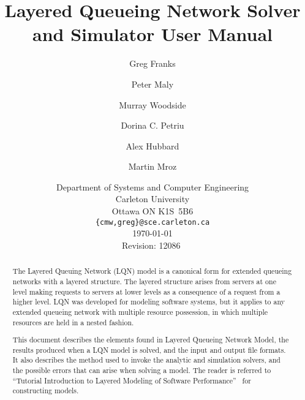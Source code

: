 \documentclass{report}
\begin{document}
\title{Layered Queueing Network Solver and Simulator User Manual}
\author{Greg Franks \and Peter Maly \and Murray Woodside \and Dorina
  C. Petriu \and Alex Hubbard \and Martin Mroz}
\date{Department of Systems and Computer Engineering\\
  Carleton University\\
  Ottawa ON K1S~5B6\\
  \texttt{\{cmw,greg\}@sce.carleton.ca}\\[1cm]
  \today\\[1cm]
  $\ $Revision: 12086 $\ $ } \maketitle \clearpage
\tableofcontents
\listoffigures
\listoftables
\clearpage
\begin{abstract}
  
The Layered Queuing Network (LQN) model is a canonical form for extended
queueing networks with a layered structure.
The layered structure arises from servers at one level making requests to servers at lower levels as a
consequence of a request from a higher level. LQN was developed for modeling software systems, but it
applies to any extended queueing network with multiple resource possession, in
which multiple resources are held in a nested fashion.

This document describes the elements found in Layered Queueing Network Model, the results produced when a
LQN model is solved, and the input and output file formats.  It also describes the method used to invoke the
analytic and simulation solvers, and the possible errors that can arise when solving a model.  The reader is
referred to ``Tutorial Introduction to Layered Modeling of Software Performance''~\cite{sw:woodside-xx} for
constructing models.
\end{abstract}










\appendix

\clearpage


%
\clearpage
\printindex
\end{document}
